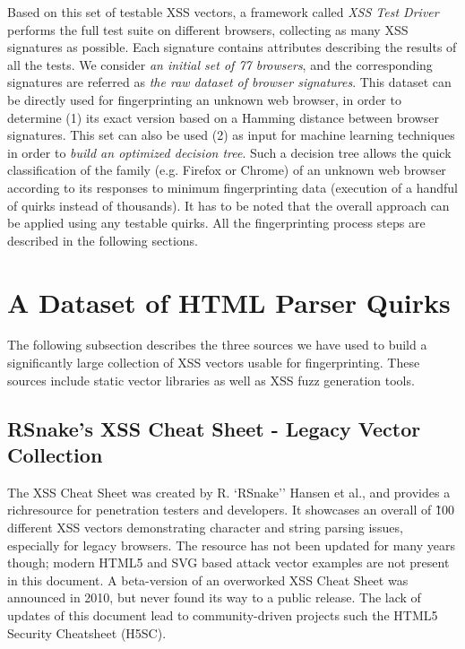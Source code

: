 \documentclass[10pt]{IEEEtran}
\begin{document}
Based on this set of testable XSS vectors, a framework called \emph{XSS Test Driver} 
performs the full test suite on different browsers, collecting as many XSS signatures as possible. 
Each signature contains attributes describing the results of all the tests. 
We consider \emph{an initial set of 77 browsers}, and the corresponding signatures are  
referred as \emph{the raw dataset of browser signatures}.
This dataset can be directly used for fingerprinting an unknown
web browser, in order to determine (1) its exact version based on a
Hamming distance between browser signatures. This set can also be used  (2) as input 
for machine learning techniques in order to
\emph{build an optimized decision tree}. Such a decision tree allows the quick classification of the family 
(e.g. Firefox or Chrome) of 
an unknown web browser according to its responses to minimum
fingerprinting data (execution of a handful of quirks instead of thousands). 
It has to be noted that the overall approach can be applied using any testable
quirks. All the fingerprinting process steps are described in the
following sections.






\section{A Dataset of HTML Parser Quirks}
\label{sec:collecting-xss-vectors}
The following subsection describes the three sources we have used to build a significantly large collection of XSS vectors usable for fingerprinting. 
These sources include static vector 
libraries as well as XSS fuzz generation tools.




\subsection{RSnake's XSS Cheat Sheet - Legacy Vector Collection}
\label{subsec:rsnake_xss_cheat_sheet}
The XSS Cheat Sheet was created by R. `RSnake'' Hansen et al., and provides a richresource for penetration testers and developers. It showcases an overall of \~100 different XSS vectors demonstrating character and string parsing issues, especially for legacy browsers. The resource has not been updated for many years though; modern HTML5 and SVG based attack vector examples are not present in this document. A beta-version of an overworked XSS Cheat Sheet was announced in 2010, but never found its way to a public release. The lack of updates of this document lead to community-driven projects such the HTML5 Security Cheatsheet (H5SC).
\end{document}
